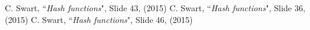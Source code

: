 \begin{thebibliography}{99}
    
C. Swart, ``{\it Hash functions}", Slide 43, (2015)
C. Swart, ``{\it Hash functions}", Slide 36, (2015)
C. Swart, ``{\it Hash functions}", Slide 46, (2015)
\end{thebibliography}
